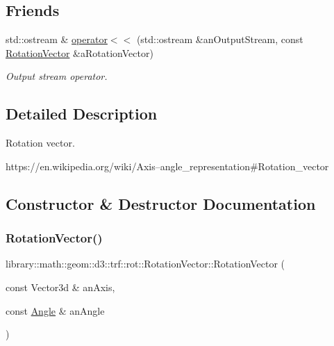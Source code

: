 \subsection*{Friends}
\begin{DoxyCompactItemize}
\item 
std\+::ostream \& \hyperlink{classlibrary_1_1math_1_1geom_1_1d3_1_1trf_1_1rot_1_1_rotation_vector_aa66ba2fd706a441ee39d06857842ecfe}{operator$<$$<$} (std\+::ostream \&an\+Output\+Stream, const \hyperlink{classlibrary_1_1math_1_1geom_1_1d3_1_1trf_1_1rot_1_1_rotation_vector}{Rotation\+Vector} \&a\+Rotation\+Vector)
\begin{DoxyCompactList}\small\item\em Output stream operator. \end{DoxyCompactList}\end{DoxyCompactItemize}


\subsection{Detailed Description}
Rotation vector. 

https\+://en.wikipedia.\+org/wiki/\+Axis–angle\+\_\+representation\#\+Rotation\+\_\+vector 

\subsection{Constructor \& Destructor Documentation}
\mbox{\label{classlibrary_1_1math_1_1geom_1_1d3_1_1trf_1_1rot_1_1_rotation_vector_a49076a279f457fdb14c4a9d4d61e1738}} 
\subsubsection{\texorpdfstring{Rotation\+Vector()}{RotationVector()}}
{\footnotesize\ttfamily library\+::math\+::geom\+::d3\+::trf\+::rot\+::\+Rotation\+Vector\+::\+Rotation\+Vector (\begin{DoxyParamCaption}\item[{const Vector3d \&}]{an\+Axis,  }\item[{const \hyperlink{classlibrary_1_1math_1_1geom_1_1_angle}{Angle} \&}]{an\+Angle }\end{DoxyParamCaption})}




